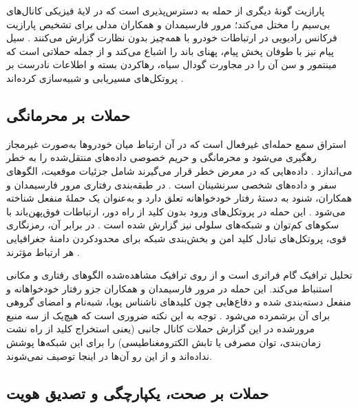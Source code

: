 \documentclass[12pt,a4paper]{article}
\begin{document}
پارازیت  گونهٔ دیگری از حمله به دسترس‌پذیری است که در لایهٔ فیزیکی کانال‌های بی‌سیم را مختل می‌کند؛ مرور فارسیمدان و همکاران مدلی برای تشخیص پارازیت فرکانس رادیویی در ارتباطات خودرو با همه‌چیز بدون نظارت گزارش می‌کنند \cite{farsimadanReviewSecurityChallenges2025}. سیل پیام  نیز با طوفان پخش پیام، پهنای باند را اشباع می‌کند و از جمله حملاتی است که مینتمور و سن آن را در مجاورت گودال سیاه، رهاکردن بسته و اطلاعات نادرست بر پروتکل‌های مسیریابی  و  شبیه‌سازی کرده‌اند \cite{VanetSecurityPrivacy}.

\subsection{حملات بر محرمانگی}

استراق سمع  حمله‌ای غیرفعال است که در آن ارتباط میان خودرو‌ها به‌صورت غیرمجاز رهگیری می‌شود و محرمانگی و حریم خصوصی داده‌های منتقل‌شده را به خطر می‌اندازد \cite{VanetSecurityPrivacy}. داده‌هایی که در معرض خطر قرار می‌گیرند شامل جزئیات موقعیت، الگو‌های سفر و داده‌های شخصی سرنشینان است \cite{VanetSecurityPrivacy}. در طبقه‌بندی رفتاری مرور فارسیمدان و همکاران، شنود به دستهٔ رفتار خودخواهانه تعلق دارد و به‌عنوان یک حملهٔ منفعل شناخته می‌شود \cite{farsimadanReviewSecurityChallenges2025}. این حمله در پروتکل‌های ورود بدون کلید از راه دور، ارتباطات فوق‌پهن‌باند با سکو‌های کم‌توان و شبکه‌های سلولی نیز گزارش شده است \cite{farsimadanReviewSecurityChallenges2025}. در برابر آن، رمزنگاری قوی، پروتکل‌های تبادل کلید امن و بخش‌بندی شبکه برای محدودکردن دامنهٔ جغرافیایی هر ارتباط مؤثرند \cite{VanetSecurityPrivacy}.

تحلیل ترافیک  گام فراتری است و از روی ترافیک مشاهده‌شده الگو‌های رفتاری و مکانی استنباط می‌کند. این حمله در مرور فارسیمدان و همکاران جزو رفتار خودخواهانه و منفعل دسته‌بندی شده و دفاع‌هایی چون کلید‌های ناشناس پویا، شبه‌نام و امضای گروهی برای آن برشمرده می‌شود \cite{farsimadanReviewSecurityChallenges2025}. توجه به این نکته ضروری است که هیچ‌یک از سه منبع مرورشده در این گزارش حملات کانال جانبی  (یعنی استخراج کلید از راه نشت زمان‌بندی، توان مصرفی یا تابش الکترومغناطیسی) را برای این شبکه‌ها پوشش نداده‌اند و از این رو آن‌ها در اینجا توصیف نمی‌شوند.

\subsection{حملات بر صحت، یکپارچگی و تصدیق هویت}
\end{document}

